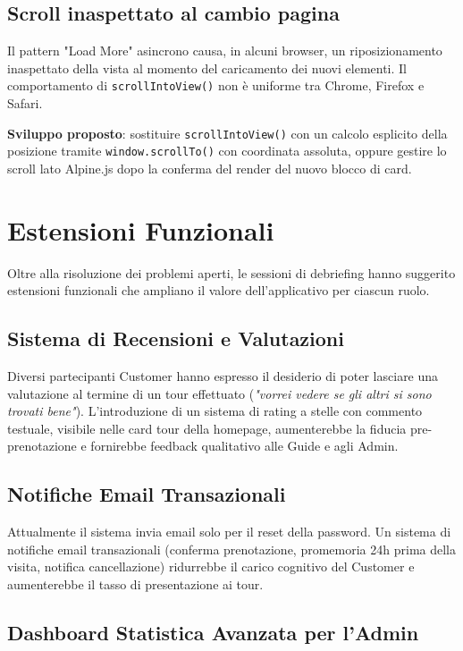 \subsection{Scroll inaspettato al cambio pagina}

Il pattern "Load More" asincrono causa, in alcuni browser, un riposizionamento inaspettato della vista al momento del caricamento dei nuovi elementi. Il comportamento di \texttt{scrollIntoView()} non è uniforme tra Chrome, Firefox e Safari.

\textbf{Sviluppo proposto}: sostituire \texttt{scrollIntoView()} con un calcolo esplicito della posizione tramite \texttt{window.scrollTo()} con coordinata assoluta, oppure gestire lo scroll lato Alpine.js dopo la conferma del render del nuovo blocco di card.

\section{Estensioni Funzionali}

Oltre alla risoluzione dei problemi aperti, le sessioni di debriefing hanno suggerito estensioni funzionali che ampliano il valore dell'applicativo per ciascun ruolo.

\subsection{Sistema di Recensioni e Valutazioni}

Diversi partecipanti Customer hanno espresso il desiderio di poter lasciare una valutazione al termine di un tour effettuato (\textit{"vorrei vedere se gli altri si sono trovati bene"}). L'introduzione di un sistema di rating a stelle con commento testuale, visibile nelle card tour della homepage, aumenterebbe la fiducia pre-prenotazione e fornirebbe feedback qualitativo alle Guide e agli Admin.

\subsection{Notifiche Email Transazionali}

Attualmente il sistema invia email solo per il reset della password. Un sistema di notifiche email transazionali (conferma prenotazione, promemoria 24h prima della visita, notifica cancellazione) ridurrebbe il carico cognitivo del Customer e aumenterebbe il tasso di presentazione ai tour.

\subsection{Dashboard Statistica Avanzata per l'Admin}

